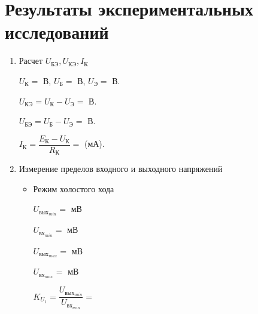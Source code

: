 \section{Результаты экспериментальных исследований}

\begin{enumerate}

\item{Расчет $ U_{\text{БЭ}} , U_{\text{КЭ}} , I_{\text{К}} $}

\bigskip

$ U_{\text{К}} = $ \hspace{8mm} В, $ U_{\text{Б}} = $ \hspace{8mm} В, $ U_{\text{Э}} = $ \hspace{8mm} В.

\bigskip

$ U_{\text{КЭ}} = U_{\text{К}} - U_{\text{Э}} = $ \hspace{8mm} В.

\bigskip

$ U_{\text{БЭ}} = U_{\text{Б}} - U_{\text{Э}} = $ \hspace{8mm} В.

\bigskip

$ I_{\text{К}} = \dfrac{E_{\text{К}} - U_{\text{К}}}{R_{\text{К}}} = $ \hspace{8mm} (мА).

\bigskip

\item{Измерение пределов входного и выходного напряжений}

\begin{itemize}

\item{Режим холостого хода}

\begin{multicols}{3}

$ U_{\text{вых}_{min}} = $ \hspace{8mm} мВ

$ U_{\text{вх}_{min}} = $ \hspace{8mm} мВ

$ U_{\text{вых}_{max}} = $ \hspace{8mm} мВ

$ U_{\text{вх}_{max}} = $ \hspace{8mm} мВ

$ K_{U_1} = \dfrac{U_{\text{вых}_{min}}}{U_{\text{вх}_{min}}} = $ \hspace{8mm}

\end{multicols}


\end{itemize}
\end{enumerate}
